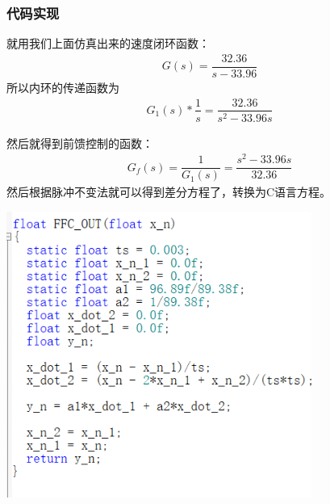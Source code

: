 \documentclass[UTF8,a4paper,12pt]{ctexart}
\begin{document}
      \subsubsection{代码实现}
        就用我们上面仿真出来的速度闭环函数：
        \begin{align*}
          G(s)=\dfrac{32.36}{s-33.96}
        \end{align*}
        所以内环的传递函数为
        \begin{align*}
          G_1(s)*\dfrac{1}{s}=\dfrac{32.36}{s^2-33.96s}
        \end{align*}
        
        然后就得到前馈控制的函数： 
        \begin{align*}
           G_f(s)=\dfrac{1}{G_1(s)}=\dfrac{s^2-33.96s}{32.36}
        \end{align*}
        然后根据脉冲不变法就可以得到差分方程了，转换为C语言方程。\\
        \par \includegraphics[width=10cm]{picture/FFC_function.png} \\
\end{document}
